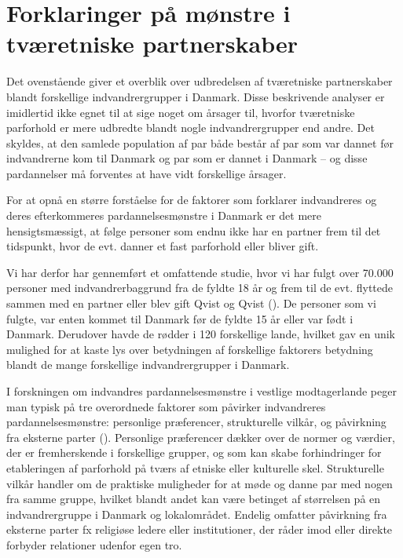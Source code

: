 \documentclass[
]{book}
\begin{document}
\section{Forklaringer på mønstre i tværetniske partnerskaber}\label{forklaringer-puxe5-muxf8nstre-i-tvuxe6retniske-partnerskaber}

Det ovenstående giver et overblik over udbredelsen af tværetniske partnerskaber blandt forskellige indvandrergrupper i Danmark. Disse beskrivende analyser er imidlertid ikke egnet til at sige noget om årsager til, hvorfor tværetniske parforhold er mere udbredte blandt nogle indvandrergrupper end andre. Det skyldes, at den samlede population af par både består af par som var dannet før indvandrerne kom til Danmark og par som er dannet i Danmark -- og disse pardannelser må forventes at have vidt forskellige årsager.

For at opnå en større forståelse for de faktorer som forklarer indvandreres og deres efterkommeres pardannelsesmønstre i Danmark er det mere hensigtsmæssigt, at følge personer som endnu ikke har en partner frem til det tidspunkt, hvor de evt. danner et fast parforhold eller bliver gift.

Vi har derfor har gennemført et omfattende studie, hvor vi har fulgt over 70.000 personer med indvandrerbaggrund fra de fyldte 18 år og frem til de evt. flyttede sammen med en partner eller blev gift Qvist og Qvist (). De personer som vi fulgte, var enten kommet til Danmark før de fyldte 15 år eller var født i Danmark. Derudover havde de rødder i 120 forskellige lande, hvilket gav en unik mulighed for at kaste lys over betydningen af forskellige faktorers betydning blandt de mange forskellige indvandrergrupper i Danmark.

I forskningen om indvandres pardannelsesmønstre i vestlige modtagerlande peger man typisk på tre overordnede faktorer som påvirker indvandreres pardannelsesmønstre: personlige præferencer, strukturelle vilkår, og påvirkning fra eksterne parter (). Personlige præferencer dækker over de normer og værdier, der er fremherskende i forskellige grupper, og som kan skabe forhindringer for etableringen af parforhold på tværs af etniske eller kulturelle skel. Strukturelle vilkår handler om de praktiske muligheder for at møde og danne par med nogen fra samme gruppe, hvilket blandt andet kan være betinget af størrelsen på en indvandrergruppe i Danmark og lokalområdet. Endelig omfatter påvirkning fra eksterne parter fx religiøse ledere eller institutioner, der råder imod eller direkte forbyder relationer udenfor egen tro.
\end{document}
